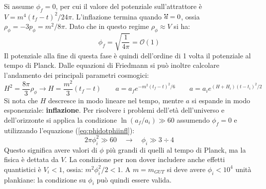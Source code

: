 Si assume $\phi_f = 0$, per cui il valore del potenziale sull'attrattore è $V= m^4 (t_f-t)^2 / 24 \pi$. L'inflazione termina quando $\accentset{\mbox{\large\bfseries ..}}{a}=0$, ossia $\rho_\phi = -3p_\phi = m^2 / 8 \pi$. Dato che in questo regime $\rho_\phi \approx V$ si ha:
$$
\phi_f = \sqrt{\frac{1}{4\pi}}= \mathcal{O}(1)
$$
Il potenziale alla fine di questa fase è quindi dell'ordine di 1 volta il potenziale al tempo di Planck. Dalle equazioni di Friedmann si può inoltre calcolare l'andamento dei principali parametri cosmogici:
\begin{equation}
    H^2 = \frac{8\pi }{3}\rho_\phi \rightarrow H = \frac{m^2}{3} (t_f -t) \qquad a=a_f e^{-m^2 (t_f-t)^2 /6} \qquad a=a_i e^{(H+H_i)(t-t_i)^2 /2}
\end{equation}
Si nota che $H$ descresce in modo lineare nel tempo, mentre $a$ si espande in modo esponenziale: \textbf{inflazione}. Per risolvere i problemi dell'età dell'universo e dell'orizzonte si applica la condizione $\ln (a_f/a_i) \gg 60$ assumendo $\phi_f = 0$ e utilizzando l'equazione (\ref{eq:phidotphiinfl}):
\begin{equation}
    2 \pi \phi_i^2 \gg 60 \quad \rightarrow \quad \phi_i \gg 3 \div 4
\end{equation}
Questo significa avere valori di $\phi$ più grandi di quelli al tempo di Planck, ma la fisica è dettata da $V$. La condizione per non dover includere anche effetti quantistici è $V_i<1$, ossia: $m^2 \phi_i^2 /2 <1$. A $m=m_{GUT}$ si deve avere $\phi_i < 10^4$ unità plankiane: la condizione su $\phi_i$ può quindi essere valida.

